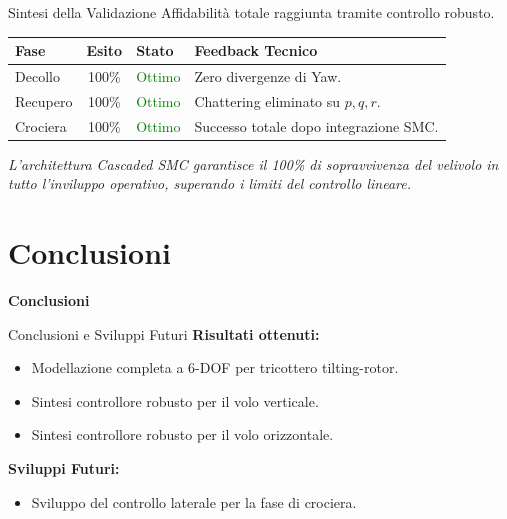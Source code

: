 \documentclass[aspectratio=169]{beamer} %
\begin{document}
\begin{frame}{Sintesi della Validazione}
    \centering
    \Large Affidabilità totale raggiunta tramite controllo robusto.
    
    \vspace{0.5cm}
    \begin{table}[]
        \centering
        \begin{tabular}{l c l p{4.5cm}}
            \toprule
            \textbf{Fase} & \textbf{Esito} & \textbf{Stato} & \textbf{Feedback Tecnico} \\
            \midrule
            Decollo & 100\% & \textcolor{green}{Ottimo} & Zero divergenze di Yaw. \\
            Recupero & 100\% & \textcolor{green}{Ottimo} & Chattering eliminato su $p,q,r$. \\
            Crociera & 100\% & \textcolor{green}{Ottimo} & Successo totale dopo integrazione SMC. \\
            \bottomrule
        \end{tabular}
    \end{table}
    \vspace{0.3cm}
    \normalsize
    \textit{L'architettura Cascaded SMC garantisce il 100\% di sopravvivenza del velivolo in tutto l'inviluppo operativo, superando i limiti del controllo lineare.}
\end{frame}


\section{Conclusioni}

\begin{frame}
    \vfill
    \centering
    {\Huge \textbf{Conclusioni}}
    \vfill
\end{frame}

\begin{frame}{Conclusioni e Sviluppi Futuri}
    \textbf{Risultati ottenuti:}
    \begin{itemize}
        \item Modellazione completa a 6-DOF per tricottero tilting-rotor.
        \item Sintesi controllore robusto per il volo verticale.
        \item Sintesi controllore robusto per il volo orizzontale.
    \end{itemize}
    
    \vspace{0.8cm}
    \textbf{Sviluppi Futuri:}
    \begin{itemize}
        \item Sviluppo del controllo laterale per la fase di crociera. 
    \end{itemize}
\end{frame}

    
\end{document}
